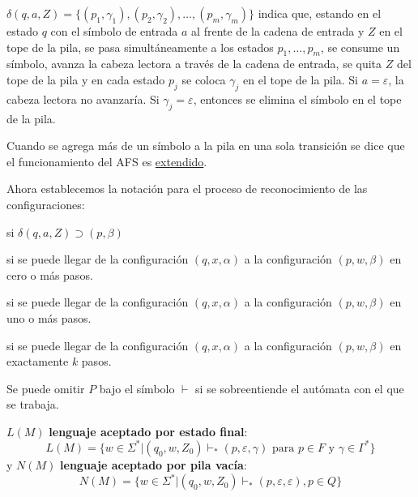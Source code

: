 \begin{nota}
$\delta (q,a,Z) = \{(p_1,\gamma_1),(p_2,\gamma_2),\dots , (p_m,\gamma_m)\}$ indica que, estando en el estado $q$ con el símbolo de entrada $a$ al frente de la cadena de entrada y $Z$ en el tope de la pila, se pasa simultáneamente a los estados $p_1,\dots , p_m$, se consume un símbolo, avanza la cabeza lectora a través de la cadena de entrada, se quita $Z$ del tope de la pila y en cada estado $p_j$ se coloca $\gamma_j$ en el tope de la pila. Si $a=\varepsilon $, la cabeza lectora no avanzaría. Si $\gamma_j=\varepsilon$, entonces se elimina el símbolo en el tope de la pila. 
\end{nota}

\begin{nota}
Cuando se agrega más de un símbolo a la pila en una sola transición se dice que el funcionamiento del AFS es \underline{extendido}. 
\end{nota}

Ahora establecemos la notación para el proceso de reconocimiento de las configuraciones:

\begin{itemize*}
\item {} si $\delta(q,a,Z)\supset (p,\beta )$
\item {} si se puede llegar de la configuración $(q,x,\alpha)$ a la configuración $(p,w,\beta)$ en cero o más pasos. 
\item {} si se puede llegar de la configuración $(q,x,\alpha)$ a la configuración $(p,w,\beta )$ en uno o más pasos. 
\item {} si se puede llegar de la configuración $(q,x,\alpha)$ a la configuración $(p,w,\beta )$ en exactamente $k$ pasos. 
\end{itemize*}


\begin{nota}
Se puede omitir $P$ bajo el símbolo $\vdash$ si se sobreentiende el autómata con el que se trabaja. 
\end{nota}
\begin{Def}
$L(M)$ \textbf{lenguaje aceptado por estado final}:
$$ L(M) = \{ w\in \Sigma^* | (q_0,w,Z_0) \vdash_* (p,\varepsilon, \gamma ) \text{ para } p \in F \text{ y } \gamma \in \Gamma^* \} $$
y $N(M)$ \textbf{lenguaje aceptado por pila vacía}:
$$N(M)= \{ w\in \Sigma^* | (q_0,w,Z_0)\vdash_* (p,\varepsilon, \varepsilon ), p\in Q\} $$
\end{Def}



